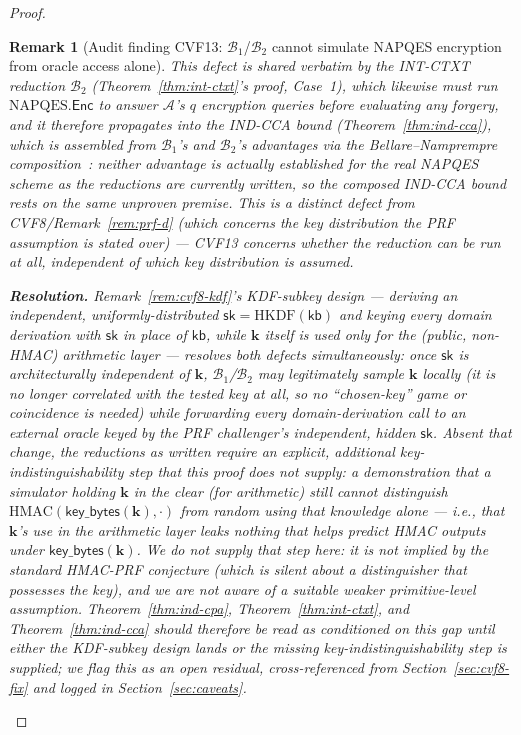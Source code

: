 \documentclass[11pt,a4paper]{article}
\newtheorem{remark}[theorem]{Remark}
\begin{document}
\begin{proof}
\begin{remark}[Audit finding CVF13: $\mathcal{B}_1$/$\mathcal{B}_2$ cannot simulate NAPQES encryption from oracle access alone]
This defect is shared verbatim by the INT-CTXT reduction $\mathcal{B}_2$
(Theorem~\ref{thm:int-ctxt}'s proof, Case~1), which likewise must run
$\mathrm{NAPQES}.\mathsf{Enc}$ to answer $\mathcal{A}$'s $q$ encryption
queries before evaluating any forgery, and it therefore propagates into
the IND-CCA bound (Theorem~\ref{thm:ind-cca}), which is assembled from
$\mathcal{B}_1$'s and $\mathcal{B}_2$'s advantages via the
Bellare--Namprempre composition~\cite{bellare2000ae}: neither advantage
is actually established for the real NAPQES scheme as the reductions are
currently written, so the composed IND-CCA bound rests on the same
unproven premise. This is a distinct defect from CVF8/Remark~\ref{rem:prf-d}
(which concerns the \emph{key distribution} the PRF assumption is stated
over) --- CVF13 concerns whether the reduction can be run \emph{at all},
independent of which key distribution is assumed.

\textbf{Resolution.} Remark~\ref{rem:cvf8-kdf}'s KDF-subkey design ---
deriving an independent, uniformly-distributed
$\mathsf{sk}=\mathrm{HKDF}(\mathsf{kb})$ and keying every domain
derivation with $\mathsf{sk}$ in place of $\mathsf{kb}$, while
$\mathbf{k}$ itself is used only for the (public, non-HMAC) arithmetic
layer --- resolves both defects simultaneously: once $\mathsf{sk}$ is
architecturally independent of $\mathbf{k}$, $\mathcal{B}_1$/$\mathcal{B}_2$
may legitimately sample $\mathbf{k}$ locally (it is no longer correlated
with the tested key at all, so no ``chosen-key'' game or coincidence is
needed) while forwarding every domain-derivation call to an external
oracle keyed by the PRF challenger's independent, hidden $\mathsf{sk}$.
Absent that change, the reductions as written require an explicit,
additional \emph{key-indistinguishability} step that this proof does not
supply: a demonstration that a simulator holding $\mathbf{k}$ in the
clear (for arithmetic) still cannot distinguish
$\mathrm{HMAC}(\mathsf{key\_bytes}(\mathbf{k}),\cdot)$ from random using
that knowledge alone --- i.e., that $\mathbf{k}$'s use in the arithmetic
layer leaks nothing that helps predict HMAC outputs under
$\mathsf{key\_bytes}(\mathbf{k})$. We do not supply that step here: it is
not implied by the standard HMAC-PRF conjecture (which is silent about a
distinguisher that possesses the key), and we are not aware of a
suitable weaker primitive-level assumption. Theorem~\ref{thm:ind-cpa},
Theorem~\ref{thm:int-ctxt}, and Theorem~\ref{thm:ind-cca} should
therefore be read as conditioned on this gap until either the
KDF-subkey design lands or the missing key-indistinguishability step is
supplied; we flag this as an open residual, cross-referenced from
Section~\ref{sec:cvf8-fix} and logged in Section~\ref{sec:caveats}.
\end{remark}


\end{proof}
\end{document}
